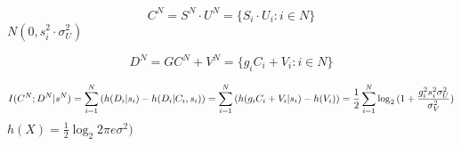 \begin{equation}
C^N= S^N \cdot U^N = \{ S_i\cdot U_i : i \in N \}
\end{equation}
$N(0, s_i^2 \cdot \sigma^2_U)$

\begin{equation}
D^N= GC^N + V^N = \{ g_i C_i + V_i : i \in N \}
\end{equation}

\begin{equation}
I(C^N; D^N|s^N)  = \sum_{i=1}^N{(h(D_i|s_i)-h(D_i|C_i,s_i))} \\
= \sum_{i=1}^N{(h( g_i C_i + V_i|s_i)-h(V_i))} \\
= \frac{1}{2}\sum_{i=1}^N{\log_2{(1+\frac{g_i^2s_i^2\sigma^2_U}{\sigma^2_V})}}
\end{equation}
$h(X)=\frac{1}{2}\log_2{2\pi e \sigma^2)}$